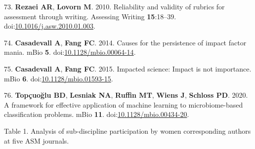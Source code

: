 \documentclass[11pt,]{article}
\begin{document}
\leavevmode\hypertarget{ref-Rezaei2010}{}%
73. \textbf{Rezaei AR}, \textbf{Lovorn M}. 2010. Reliability and
validity of rubrics for assessment through writing. Assessing Writing
\textbf{15}:18--39.
doi:\href{https://doi.org/10.1016/j.asw.2010.01.003}{10.1016/j.asw.2010.01.003}.

\leavevmode\hypertarget{ref-Casadevall2014}{}%
74. \textbf{Casadevall A}, \textbf{Fang FC}. 2014. Causes for the
persistence of impact factor mania. mBio \textbf{5}.
doi:\href{https://doi.org/10.1128/mbio.00064-14}{10.1128/mbio.00064-14}.

\leavevmode\hypertarget{ref-Casadevall2015}{}%
75. \textbf{Casadevall A}, \textbf{Fang FC}. 2015. Impacted science:
Impact is not importance. mBio \textbf{6}.
doi:\href{https://doi.org/10.1128/mbio.01593-15}{10.1128/mbio.01593-15}.

\leavevmode\hypertarget{ref-Topuolu2020}{}%
76. \textbf{Topçuoğlu BD}, \textbf{Lesniak NA}, \textbf{Ruffin MT},
\textbf{Wiens J}, \textbf{Schloss PD}. 2020. A framework for effective
application of machine learning to microbiome-based classification
problems. mBio \textbf{11}.
doi:\href{https://doi.org/10.1128/mbio.00434-20}{10.1128/mbio.00434-20}.

\newpage

Table 1. Analysis of sub-discipline participation by women corresponding
authors at five ASM journals.
\end{document}

